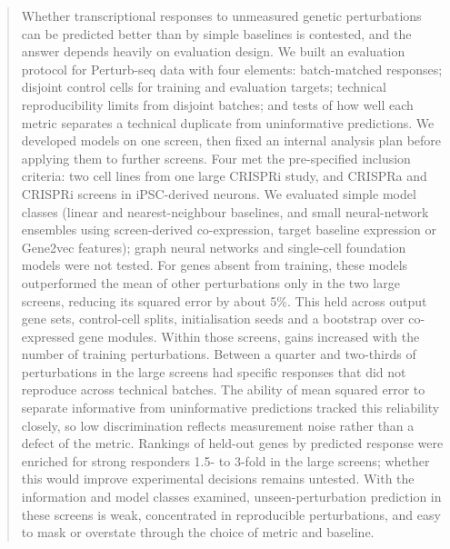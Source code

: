 \begin{abstract}
\noindent Whether transcriptional responses to unmeasured genetic perturbations can be predicted better than by simple baselines is contested, and the answer depends heavily on evaluation design. We built an evaluation protocol for Perturb-seq data with four elements: batch-matched responses; disjoint control cells for training and evaluation targets; technical reproducibility limits from disjoint batches; and tests of how well each metric separates a technical duplicate from uninformative predictions. We developed models on one screen, then fixed an internal analysis plan before applying them to further screens. Four met the pre-specified inclusion criteria: two cell lines from one large CRISPRi study, and CRISPRa and CRISPRi screens in iPSC-derived neurons. We evaluated simple model classes (linear and nearest-neighbour baselines, and small neural-network ensembles using screen-derived co-expression, target baseline expression or Gene2vec features); graph neural networks and single-cell foundation models were not tested. For genes absent from training, these models outperformed the mean of other perturbations only in the two large screens, reducing its squared error by about 5\%. This held across output gene sets, control-cell splits, initialisation seeds and a bootstrap over co-expressed gene modules. Within those screens, gains increased with the number of training perturbations. Between a quarter and two-thirds of perturbations in the large screens had specific responses that did not reproduce across technical batches. The ability of mean squared error to separate informative from uninformative predictions tracked this reliability closely, so low discrimination reflects measurement noise rather than a defect of the metric. Rankings of held-out genes by predicted response were enriched for strong responders 1.5- to 3-fold in the large screens; whether this would improve experimental decisions remains untested. With the information and model classes examined, unseen-perturbation prediction in these screens is weak, concentrated in reproducible perturbations, and easy to mask or overstate through the choice of metric and baseline.
\end{abstract}
